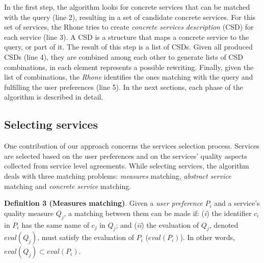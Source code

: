 In the first step, the algorithm looks for concrete services that 
can be matched with the query (line 2), resulting in a set of candidate concrete
services. For this set of services, the Rhone tries to create 
\textit{concrete services description} (CSD) for each service (line 3). 
A CSD is a structure that maps a concrete service to the query, or part of it. 
The  result of this step is a list of CSDs.
Given all produced CSDs  (line 4), they are combined among each other to
generate lists of CSD combinations, in each element represents a possible
rewriting.
Finally, given the list of combinations, the \textit{Rhone} identifies the
ones matching with the query and fulfilling the user preferences (line 5).
In the next sections, each phase of the algorithm is described in detail. 

\subsection{Selecting services}

One contribution of our approach concerns the services selection process. Services are selected based on the user preferences and on the services' quality aspects collected from service level agreements.
While selecting services, the algorithm deals with three matching problems: \textit{measures} matching, \textit{abstract service} matching and \textit{concrete service} matching.
\bigskip

\noindent \textbf{Definition 3 (Measures matching)}.
Given a \textit{user preference} $P_{i}$ and a service's quality measure $Q_{j}$, a matching between them can be made if: (\textit{i}) the identifier $c_{i}$ in $P_{i}$ has the same name of $c_{j}$ in $Q_{j}$; and
(\textit{ii}) the evaluation of $Q_{j}$, denoted $eval(Q_{j})$, must satisfy the evaluation of $P_{i}$ ($eval(P_{i})$). In other words, $eval(Q_{j}) \subset eval(P_{i})$.
\bigskip

